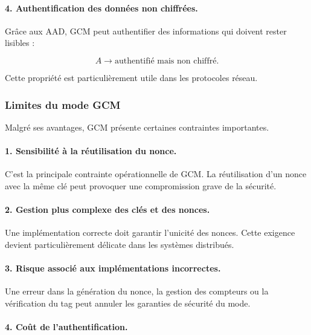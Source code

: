 \documentclass[12pt,a4paper]{article}
\begin{document}
\paragraph{4. Authentification des données non chiffrées.}

Grâce aux AAD, GCM peut authentifier des informations qui doivent
rester lisibles :

\begin{equation}
A \longrightarrow \text{authentifié mais non chiffré}.
\end{equation}

Cette propriété est particulièrement utile dans les protocoles
réseau.

\subsubsection{Limites du mode GCM}

Malgré ses avantages, GCM présente certaines contraintes importantes.

\paragraph{1. Sensibilité à la réutilisation du nonce.}

C'est la principale contrainte opérationnelle de GCM. La réutilisation
d'un nonce avec la même clé peut provoquer une compromission grave de
la sécurité.

\paragraph{2. Gestion plus complexe des clés et des nonces.}

Une implémentation correcte doit garantir l'unicité des nonces.
Cette exigence devient particulièrement délicate dans les systèmes
distribués.

\paragraph{3. Risque associé aux implémentations incorrectes.}

Une erreur dans la génération du nonce, la gestion des compteurs ou
la vérification du tag peut annuler les garanties de sécurité du
mode.

\paragraph{4. Coût de l'authentification.}
\end{document}
